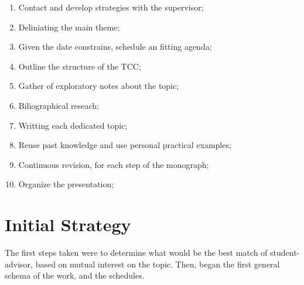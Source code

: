 \documentclass[
12pt,				%
openright,			%
oneside,			%
a4paper,			%
brazil,				%
english,			%
]{abntex2}
\begin{document}
\begin{enumerate}
  \item Contact and develop strategies with the supervisor;
  \item Deliniating the main theme;
  \item Given the date constrains, schedule an fitting agenda;
  \item Outline the structure of the TCC;
  \item Gather of exploratory notes about the topic;
  \item Biliographical reseach;
  \item Writting each dedicated topic;
  \item Reuse past knowledge and use personal practical examples; 
  \item Continuous revision, for each step of the monograph;
  \item Organize the presentation;
\end{enumerate}

\section{Initial Strategy}
The first steps taken were to determine what would be the best match of student-advisor, based on mutual interest on the topic. Then, began the first general schema of the work, and the schedules.

\end{document}
